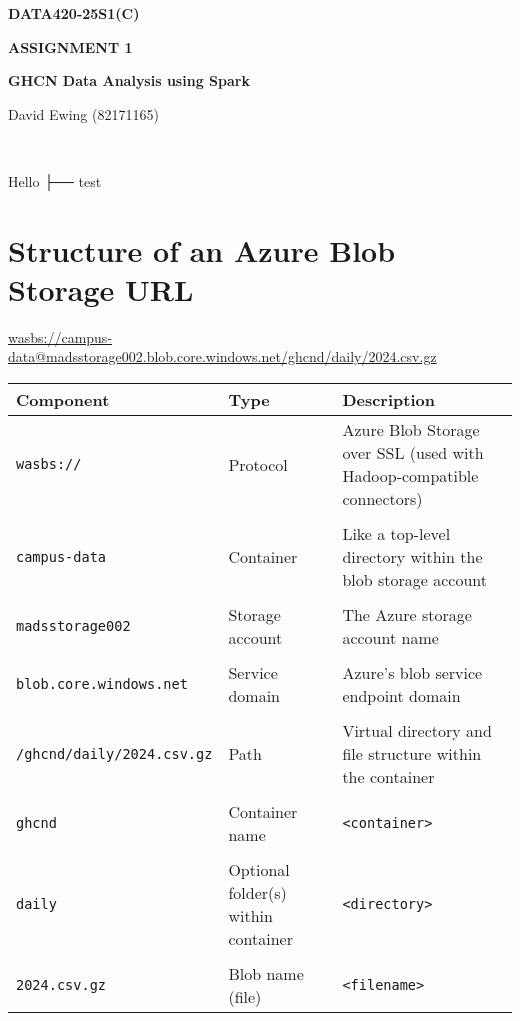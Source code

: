 \documentclass[11pt]{article}
\newcommand{\nowdatetime}{%
  \DTMnow%
  \DTMuseDate{today}~\DTMusecurrenttime%
}
\begin{document}
\begin{center}
  \centering
  \vspace*{2cm}
  
  {\Large\textbf{DATA420-25S1(C)}\par}
  
  \vspace{0.5cm}
  {\large\textbf{ASSIGNMENT 1}\par}
  
  \vspace{4cm}
  {\Huge\textbf{GHCN Data Analysis using Spark}\par}
  
  \vfill
  {\large David Ewing (82171165)\par}
  
  \vspace{0.3cm}
  {\large \nowdatetime\par}
  
  \vspace{3cm}
\end{center}

\thispagestyle{empty}
\newpage

Hello ├── test

\section*{Structure of an Azure Blob Storage URL}
\sloppy
  \url{wasbs://campus-data@madsstorage002.blob.core.windows.net/ghcnd/daily/2024.csv.gz}
\bigskip

\noindent
\begin{tabular}{@{}L{0.32\textwidth} L{0.12\textwidth} L{0.44\textwidth}@{}}
\toprule
\textbf{Component} & \textbf{Type} & \textbf{Description} \\
\midrule
\texttt{wasbs://} & Protocol & Azure Blob Storage over SSL (used with Hadoop-compatible connectors) \\
&   &  \\
\texttt{campus-data} & Container & Like a top-level directory within the blob storage account \\
&   &  \\
\texttt{madsstorage002} & Storage account  & The Azure storage account name \\
&   &  \\
\texttt{blob.core.windows.net} & Service domain & Azure’s blob service endpoint domain \\
&   &  \\
\texttt{/ghcnd/daily/2024.csv.gz} & Path & Virtual directory and file structure within the container \\
&   &  \\
\texttt{ghcnd} & Container name & \texttt{<container>} \\
&   &  \\
\texttt{daily} & Optional folder(s) within container & \texttt{<directory>}\\
&   &  \\
\texttt{2024.csv.gz} & Blob name (file) &  \texttt{<filename>} \\
\bottomrule
\end{tabular}
\end{document}

